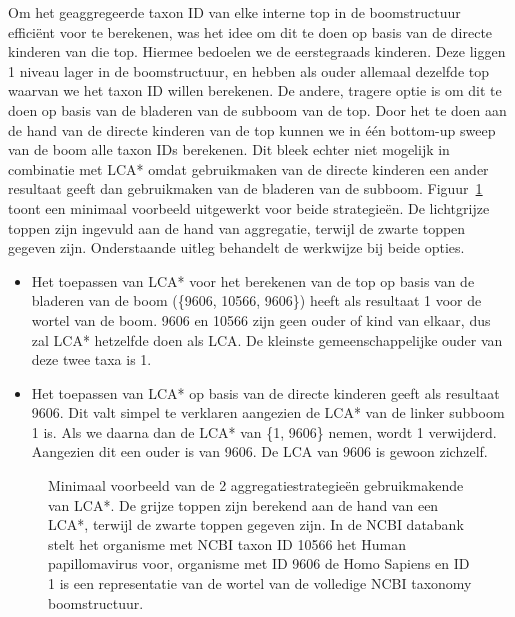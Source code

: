 Om het geaggregeerde taxon ID van elke interne top in de boomstructuur efficiënt voor te berekenen, was het idee om dit te doen op basis van de directe kinderen van die top.
Hiermee bedoelen we de eerstegraads kinderen.
Deze liggen 1 niveau lager in de boomstructuur, en hebben als ouder allemaal dezelfde top waarvan we het taxon ID willen berekenen.
De andere, tragere optie is om dit te doen op basis van de bladeren van de subboom van de top.
Door het te doen aan de hand van de directe kinderen van de top kunnen we in één bottom-up sweep van de boom alle taxon IDs berekenen.
Dit bleek echter niet mogelijk in combinatie met LCA* omdat gebruikmaken van de directe kinderen een ander resultaat geeft dan gebruikmaken van de bladeren van de subboom.
Figuur~\ref{fig:lca*_diff} toont een minimaal voorbeeld uitgewerkt voor beide strategieën.
De lichtgrijze toppen zijn ingevuld aan de hand van aggregatie, terwijl de zwarte toppen gegeven zijn.
Onderstaande uitleg behandelt de werkwijze bij beide opties.
\begin{itemize}
    \item Het toepassen van LCA* voor het berekenen van de top op basis van de bladeren van de boom (\{9606, 10566, 9606\}) heeft als resultaat 1 voor de wortel van de boom.
    9606 en 10566 zijn geen ouder of kind van elkaar, dus zal LCA* hetzelfde doen als LCA\@.
    De kleinste gemeenschappelijke ouder van deze twee taxa is 1.
    \item Het toepassen van LCA* op basis van de directe kinderen geeft als resultaat 9606.
    Dit valt simpel te verklaren aangezien de LCA* van de linker subboom 1 is.
    Als we daarna dan de LCA* van \{1, 9606\} nemen, wordt 1 verwijderd.
    Aangezien dit een ouder is van 9606.
    De LCA van 9606 is gewoon zichzelf.
\end{itemize}

\begin{figure}[h]
    \centering
    \hspace{0.25\textwidth}%
    \caption{Minimaal voorbeeld van de 2 aggregatiestrategieën gebruikmakende van LCA*. De grijze toppen zijn berekend aan de hand van een LCA*, terwijl de zwarte toppen gegeven zijn. In de NCBI databank stelt het organisme met NCBI taxon ID 10566 het Human papillomavirus voor, organisme met ID 9606 de Homo Sapiens en ID 1 is een representatie van de wortel van de volledige NCBI taxonomy boomstructuur.}\label{fig:lca*_diff}
\end{figure}

